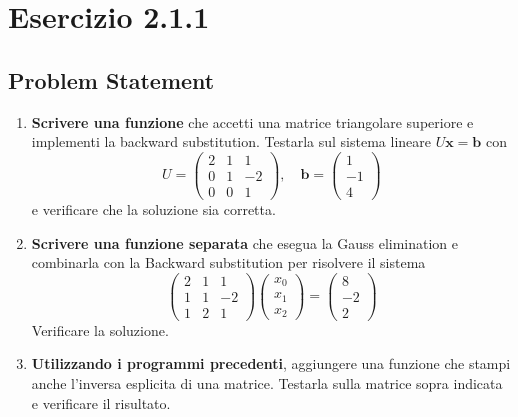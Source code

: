 \section{Esercizio 2.1.1}

\subsection{Problem Statement}
\begin{enumerate}
    \item \textbf{Scrivere una funzione} che accetti una matrice triangolare superiore e implementi la backward substitution. Testarla sul sistema lineare $U\mathbf{x} = \mathbf{b}$ con
    \[
        U = \begin{pmatrix} 2 & 1 & 1 \\ 0 & 1 & -2 \\ 0 & 0 & 1 \end{pmatrix}, \quad \mathbf{b} = \begin{pmatrix} 1 \\ -1 \\ 4 \end{pmatrix}
    \]
    e verificare che la soluzione sia corretta.

    \item \textbf{Scrivere una funzione separata} che esegua la Gauss elimination e combinarla con la Backward substitution per risolvere il sistema
    \[
        \begin{pmatrix} 2 & 1 & 1 \\ 1 & 1 & -2 \\ 1 & 2 & 1 \end{pmatrix} \begin{pmatrix} x_0 \\ x_1 \\ x_2 \end{pmatrix} = \begin{pmatrix} 8 \\ -2 \\ 2 \end{pmatrix}
    \]
    Verificare la soluzione. 

    \item \textbf{Utilizzando i programmi precedenti}, aggiungere una funzione che stampi anche l'inversa esplicita di una matrice. Testarla sulla matrice sopra indicata e verificare il risultato.


\end{enumerate}
